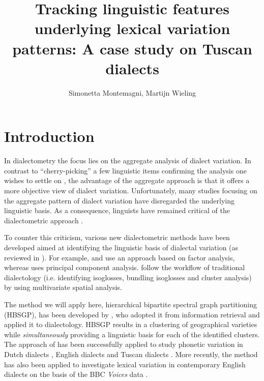 \documentclass[output=paper]{LSP/langsci}
\author{Simonetta Montemagni, Martijn Wieling}
\title{Tracking linguistic features underlying lexical variation patterns: A case study on Tuscan dialects}
\begin{document}
 
 
% 

% 
% 

\section{Introduction}
In dialectometry \citep{seguy_relation_1971} the focus lies on the aggregate analysis of dialect variation. In contrast to “cherry-picking” a few linguistic items confirming the analysis one wishes to settle on \citep{nerbonne_data-driven_2009}, the advantage of the aggregate approach is that it offers a more objective view of dialect variation. Unfortunately, many studies focusing on the aggregate pattern of dialect variation have disregarded the underlying linguistic basis. As a consequence, linguists have remained critical of the dialectometric approach \citep{schneider_qualitative_1988,woolhiser_political_2005, loporcaro_profilo_2009}. 

To counter this criticism, various new dialectometric methods have been developed aimed at identifying the linguistic basis of dialectal variation (as reviewed in \citealt{wieling_advances_2015}). For example, \citet{nerbonne_identifying_2006} and \citet{proll_latente_inpress} use an approach based on factor analysis, whereas \citet{shackleton_english-american_2005} uses principal component analysis. \citet{GrieveEtAl2011} follow the workflow of traditional dialectology (i.e. identifying isoglosses, bundling isoglosses and cluster analysis) by using multivariate spatial analysis. 

The method we will apply here, hierarchical bipartite spectral graph partitioning (HBSGP), has been developed by \citet{wieling_bipartite_2009,wieling_hierarchical_2010, wieling_bipartite_2011}, who adopted it from information retrieval \citep{dhillon_co-clustering_2001} and applied it to dialectology. HBSGP results in a clustering of geographical varieties while \emph{simultaneously }providing a linguistic basis for each of the identified clusters. The approach of \citet{wieling_bipartite_2011} has been successfully applied to study phonetic variation in Dutch dialects \citep{wieling_bipartite_2011}, English dialects \citep{wieling_analyzing_2013} and Tuscan dialects \citep{montemagni_patterns_2012,montemagni_synchronic_2013}. More recently, the method has also been applied to investigate lexical variation in contemporary English dialects on the basis of the BBC \textit{Voices} data \citep{wieling_lexical_2014}.
\end{document}
